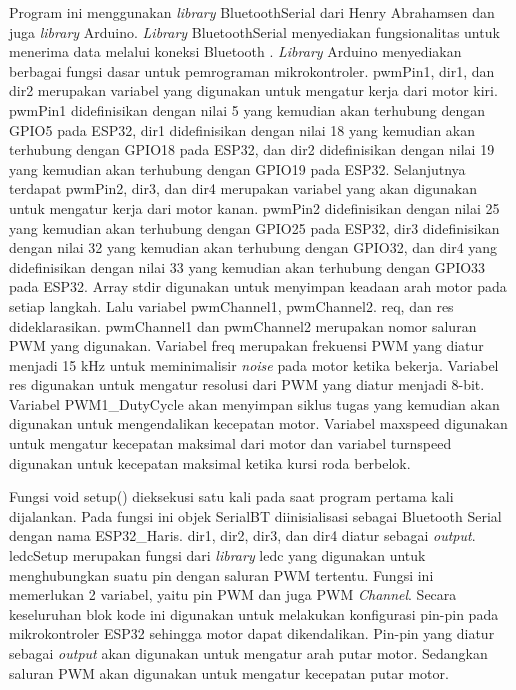 Program ini menggunakan \emph{library} BluetoothSerial dari Henry Abrahamsen dan juga \emph{library} Arduino. \emph{Library} BluetoothSerial menyediakan fungsionalitas untuk menerima data melalui koneksi Bluetooth \parencite{Abrahamsen_2023}. \emph{Library} Arduino menyediakan berbagai fungsi dasar untuk pemrograman mikrokontroler. pwmPin1, dir1, dan dir2 merupakan variabel yang digunakan untuk mengatur kerja dari motor kiri. pwmPin1 didefinisikan dengan nilai 5 yang kemudian akan terhubung dengan GPIO5 pada ESP32, dir1 didefinisikan dengan nilai 18 yang kemudian akan terhubung dengan GPIO18 pada ESP32, dan dir2 didefinisikan dengan nilai 19 yang kemudian akan terhubung dengan GPIO19 pada ESP32. Selanjutnya terdapat pwmPin2, dir3, dan dir4 merupakan variabel yang akan digunakan untuk mengatur kerja dari motor kanan. pwmPin2 didefinisikan dengan nilai 25 yang kemudian akan terhubung dengan GPIO25 pada ESP32, dir3 didefinisikan dengan nilai 32 yang kemudian akan terhubung dengan GPIO32, dan dir4 yang didefinisikan dengan nilai 33 yang kemudian akan terhubung dengan GPIO33 pada ESP32. Array stdir digunakan untuk menyimpan keadaan arah motor pada setiap langkah. Lalu variabel pwmChannel1, pwmChannel2. req, dan res dideklarasikan. pwmChannel1 dan pwmChannel2 merupakan nomor saluran PWM yang digunakan. Variabel freq merupakan frekuensi PWM yang diatur menjadi 15 kHz untuk meminimalisir \emph{noise} pada motor ketika bekerja. Variabel res digunakan untuk mengatur resolusi dari PWM yang diatur menjadi 8-bit. Variabel PWM1\_DutyCycle akan menyimpan siklus tugas yang kemudian akan digunakan untuk mengendalikan kecepatan motor. Variabel maxspeed digunakan untuk mengatur kecepatan maksimal dari motor dan variabel turnspeed digunakan untuk kecepatan maksimal ketika kursi roda berbelok.

Fungsi void setup() dieksekusi satu kali pada saat program pertama kali dijalankan. Pada fungsi ini objek SerialBT diinisialisasi sebagai Bluetooth Serial dengan nama ESP32\_Haris. dir1, dir2, dir3, dan dir4 diatur sebagai \emph{output}. ledcSetup merupakan fungsi dari \emph{library} ledc yang digunakan untuk menghubungkan suatu pin dengan saluran PWM tertentu. Fungsi ini memerlukan 2 variabel, yaitu pin PWM dan juga PWM \emph{Channel}. Secara keseluruhan blok kode ini digunakan untuk melakukan konfigurasi pin-pin pada mikrokontroler ESP32 sehingga motor dapat dikendalikan. Pin-pin yang diatur sebagai \emph{output} akan digunakan untuk mengatur arah putar motor. Sedangkan saluran PWM akan digunakan untuk mengatur kecepatan putar motor.

